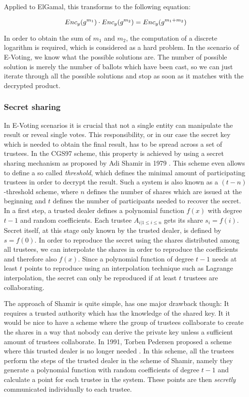\documentclass[numbers=noenddot, abstract=on]{scrreprt}
\begin{document}
Applied to ElGamal, this transforms to the following equation:

\begin{equation}
Enc_y(g^{m_1}) \cdot Enc_y(g^{m_2}) = Enc_y(g^{m_1 + m_2}) \notag
\end{equation}

In order to obtain the sum of $m_1$ and $m_2$, the computation of a discrete
logarithm is required, which is considered as a hard problem. In the scenario of
E-Voting, we know what the possible solutions are. The number of possible
solution is merely the number of ballots which have been cast, so we can just
iterate through all the possible solutions and stop as soon as it matches with
the decrypted product.


\subsubsection{Secret sharing}
\label{sec:secretsharing}
In E-Voting scenarios it is crucial that not a
single entity can manipulate the result or reveal single votes. This
responsibility, or in our case the secret key which is needed to obtain the
final result, has to be spread across a set of trustees. In the CGS97 scheme,
this property is achieved by using a secret sharing mechanism as proposed by Adi
Shamir in 1979 \cite{SHA79}. This scheme even allows to define a so called
\textit{threshold}, which defines the minimal amount of participating trustees
in order to decrypt the result. Such a system is also known as a
$(t-n)$-threshold scheme, where $n$ defines the number of shares which are
issued at the beginning and $t$ defines the number of participants needed to
recover the secret. In a first step, a trusted dealer defines a polynomial
function $f(x)$ with degree $t-1$ and random coefficients. Each trustee $A_{i |
1 \leq i \leq n}$ gets its share $s_i=f(i)$. Secret itself, at this stage only
known by the trusted dealer, is defined by $s=f(0)$. In order to reproduce the
secret using the shares distributed among all trustees, we can interpolate the
shares in order to reproduce the coefficients and therefore also $f(x)$. Since a
polynomial function of degree $t-1$ needs at least $t$ points to reproduce using
an interpolation technique such as Lagrange interpolation, the secret can only
be reproduced if at least $t$ trustees are collaborating. 

The approach of Shamir is quite simple, has one major drawback though: It
requires a trusted authority which has the knowledge of the shared key. It it
would be nice to have a scheme where the group of trustees collaborate to create
the shares in a way that nobody can derive the private key unless a sufficient
amount of trustees collaborate. In 1991, Torben Pedersen proposed a scheme where
this trusted dealer is no longer needed \cite{PED91}. In this scheme, all the
trustees perform the steps of the trusted dealer in the scheme of Shamir, namely
they generate a polynomial function with random coefficients of degree $t-1$ and
calculate a point for each trustee in the system. These points are then
\textit{secretly} communicated individually to each trustee.
\end{document}

